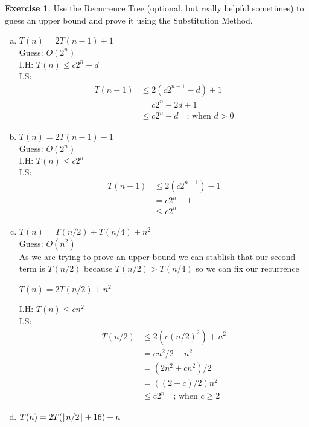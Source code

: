 \documentclass{article}
\DeclarePairedDelimiter\floor{\lfloor}{\rfloor}
\theoremstyle{definition}
\newtheorem{exercise}{Exercise}[section]
\begin{document}
\begin{exercise}
    Use the Recurrence Tree (optional, but really helpful sometimes) to guess an upper bound and prove it using the Substitution Method. 
    \begin{enumerate}[a)]
        \item $T(n) = 2T(n-1) + 1$\\
            Guess: $O(2^n)$\\
            I.H: $T(n) \leqslant \textit{c}2^n-d$\\
            I.S: 
            \begin{align*}
                T(n-1) &\leqslant 2(c 2^{n-1}-d)+1\\
                &=  c2^n-2d+1\\
                &\leqslant c2^n -d \quad\text{;  when $d > 0$}               
            \end{align*}
            
        \item $T(n) = 2T(n-1) - 1$\\
        Guess: $O(2^n)$\\
        I.H: $T(n) \leqslant \textit{c}2^n$\\
        I.S: 
        \begin{align*}
            T(n-1) &\leqslant 2(c 2^{n-1})-1\\
            &=  c2^n-1\\
            &\leqslant c2^n                 
        \end{align*}
        \item $T(n) = T(n/2) + T(n/4) + n^2$\\
        Guess: $O(n^2)$\\
        As we are trying to prove an upper bound we can stablish that our second term is $T(n/2)$ because $T(n/2)>T(n/4)$ so we can fix our recurrence 
        \begin{center}
            $T(n)=2T(n/2)+n^2$
        \end{center}
        I.H: $T(n) \leqslant \textit{c}n^2$\\
        I.S: 
        \begin{align*}
            T(n/2) &\leqslant 2(c(n/2)^2)+n^2\\
            &=  cn^2/2 + n^2\\
            &=  (2n^2+cn^2)/2\\
            &= ((2+c)/2)n^2\\
            &\leqslant c2^n  \quad\text{;  when $c\geqslant2$}               
        \end{align*}
        \item $T(n) = 2T(\floor*{n/2} + 16) + n$
    \end{enumerate}
\end{exercise}
\end{document}

